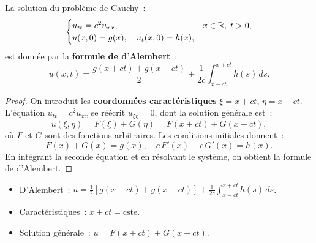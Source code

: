 \begin{theoreme}
La solution du probl\`eme de Cauchy~:
\begin{equation}\label{eq:cauchy_ondes_1d}
    \begin{cases}
        u_{tt} = c^2 u_{xx}, & x \in \mathbb{R},\; t > 0,\\
        u(x,0) = g(x), \quad u_t(x,0) = h(x),
    \end{cases}
\end{equation}
est donn\'ee par la \textbf{formule de d'Alembert}~:
\begin{equation}\label{eq:dalembert}
    \boxed{u(x,t) = \frac{g(x+ct) + g(x-ct)}{2}
    + \frac{1}{2c}\int_{x-ct}^{x+ct} h(s)\, ds.}
\end{equation}
\end{theoreme}

\begin{proof}
On introduit les \textbf{coordonn\'ees caract\'eristiques}
$\xi = x + ct$, $\eta = x - ct$. L'\'equation $u_{tt} = c^2 u_{xx}$
se r\'e\'ecrit $u_{\xi\eta} = 0$, dont la solution g\'en\'erale est~:
\[
    u(\xi, \eta) = F(\xi) + G(\eta) = F(x+ct) + G(x-ct),
\]
o\`u $F$ et $G$ sont des fonctions arbitraires. Les conditions initiales
donnent~:
\[
    F(x) + G(x) = g(x), \quad c\, F'(x) - c\, G'(x) = h(x).
\]
En int\'egrant la seconde \'equation et en r\'esolvant le syst\`eme, on obtient
la formule de d'Alembert.
\end{proof}

\begin{center}
\end{center}

\begin{formules}[title=\textbf{\'Equation des ondes 1D --- formules cl\'es}]
\begin{itemize}
    \item D'Alembert~: $u = \frac{1}{2}[g(x+ct)+g(x-ct)] + \frac{1}{2c}\int_{x-ct}^{x+ct} h(s)\, ds$.
    \item Caract\'eristiques~: $x \pm ct = \text{cste}$.
    \item Solution g\'en\'erale~: $u = F(x+ct) + G(x-ct)$.
\end{itemize}
\end{formules}

